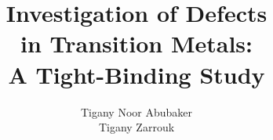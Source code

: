 \title{Investigation of Defects\\in Transition Metals:\\ A Tight-Binding Study}

\author{Tigany Noor Abubaker\\Tigany Zarrouk}



\renewcommand{\submissiontext}{A thesis submitted in partial fulfilment of the requirements for the degree of Doctor of Philosophy at King's College London.}




